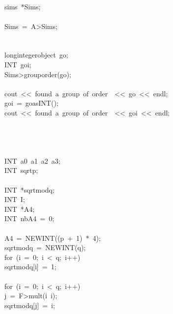 \begin{tabbing}
\>\>\\[0pt]
\\[0pt]
\\[0pt]
\\[0pt]
\>sims\ *Sims;\\[0pt]
\\[0pt]
\>Sims\ =\ A>Sims;\>\\[0pt]
\\[0pt]
\>\\[0pt]
\>longintegerobject\ go;\\[0pt]
\>INT\ goi;\\[0pt]
\>Sims>grouporder(go);\\[0pt]
\\[0pt]
\>cout\ <<\ found\ a\ group\ of\ order\ \ <<\ go\ <<\ endl;\\[0pt]
\>goi\ =\ goasINT();\\[0pt]
\>cout\ <<\ found\ a\ group\ of\ order\ \ <<\ goi\ <<\ endl;\\[0pt]
\\[0pt]
\>\\[0pt]
\\[0pt]
\\[0pt]
\>INT\ a0\ a1\ a2\ a3;\\[0pt]
\>INT\ sqrtp;\\[0pt]
\\[0pt]
\>INT\ *sqrtmodq;\\[0pt]
\>INT\ I;\\[0pt]
\>INT\ *A4;\\[0pt]
\>INT\ nbA4\ =\ 0;\\[0pt]
\\[0pt]
\>A4\ =\ NEWINT((p\ +\ 1)\ *\ 4);\\[0pt]
\>sqrtmodq\ =\ NEWINT(q);\\[0pt]
\>for\ (i\ =\ 0;\ i\ <\ q;\ i++)\ \\[0pt]
\>\>sqrtmodq[i]\ =\ 1;\\[0pt]
\>\>\\[0pt]
\>for\ (i\ =\ 0;\ i\ <\ q;\ i++)\ \\[0pt]
\>\>j\ =\ F>mult(i\ i);\\[0pt]
\>\>sqrtmodq[j]\ =\ i;\\[0pt]

\end{tabbing}
